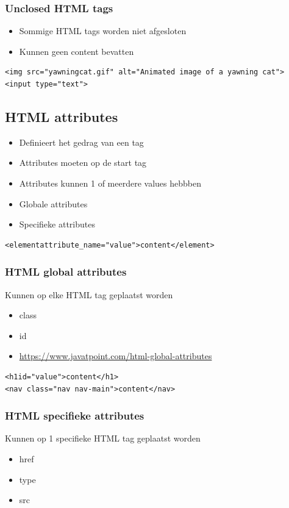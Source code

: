 \documentclass{article}
\begin{document}
\subsubsection{Unclosed HTML tags}
\begin{itemize}
    \item Sommige HTML tags worden niet afgesloten
    \item Kunnen geen content bevatten
\end{itemize}
\begin{lstlisting}
<img src="yawningcat.gif" alt="Animated image of a yawning cat">
<input type="text">
\end{lstlisting}

\subsection {HTML attributes}
\begin{itemize}
    \item Definieert het gedrag van een tag
    \item Attributes moeten op de start tag
    \item Attributes kunnen 1 of meerdere values hebbben
    \item Globale attributes
    \item Specifieke attributes
\end{itemize}

\begin{lstlisting}
<elementattribute_name="value">content</element>
\end{lstlisting}

\subsubsection{HTML global attributes}
Kunnen op elke HTML tag geplaatst worden
\begin{itemize}
    \item class
    \item id
    \item \url{https://www.javatpoint.com/html-global-attributes}
\end{itemize}

\begin{lstlisting}
<h1id="value">content</h1>
<nav class="nav nav-main">content</nav>
\end{lstlisting}

\subsubsection{HTML specifieke attributes}
Kunnen op 1 specifieke HTML tag geplaatst worden 
\begin{itemize}
    \item href
    \item type
    \item src
\end{itemize}
\end{document}

